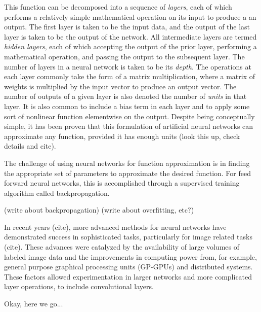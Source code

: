 This function can be decomposed into a sequence of \textit{layers}, each of which performs a relatively simple mathematical operation on its input to produce a an output.
The first layer is taken to be the input data, and the output of the last layer is taken to be the output of the network. 
All intermediate layers are termed \textit{hidden layers}, each of which accepting the output of the prior layer, performing a mathematical operation, and passing the output to the subsequent layer.
The number of layers in a neural network is taken to be its \textit{depth}.
The operations at each layer commonly take the form of a matrix multiplication, where a matrix of weights is multiplied by the input vector to produce an output vector.
The number of outputs of a given layer is also denoted the number of \textit{units} in that layer. 
It is also common to include a bias term in each layer and to apply some sort of nonlinear function elementwise on the output.
Despite being conceptually simple, it has been proven that this formulation of artificial neural networks can approximate any function, provided it has enough units (look this up, check details and cite).

The challenge of using neural networks for function approximation is in finding the appropriate set of parameters to approximate the desired function. 
For feed forward neural networks, this is accomplished through a supervised training algorithm called backpropagation. 

(write about backpropagation)
(write about overfitting, etc?)

In recent years (cite), more advanced methods for neural networks have demonstrated success in sophisticated tasks, particularly for image related tasks (cite). 
These advances were catalyzed by the availability of large volumes of labeled image data and the improvements in computing power from, for example, general purpose graphical processing units (GP-GPUs) and distributed systems.
These factors allowed experimentation in larger networks and more complicated layer operations, to include convolutional layers.

Okay, here we go...





